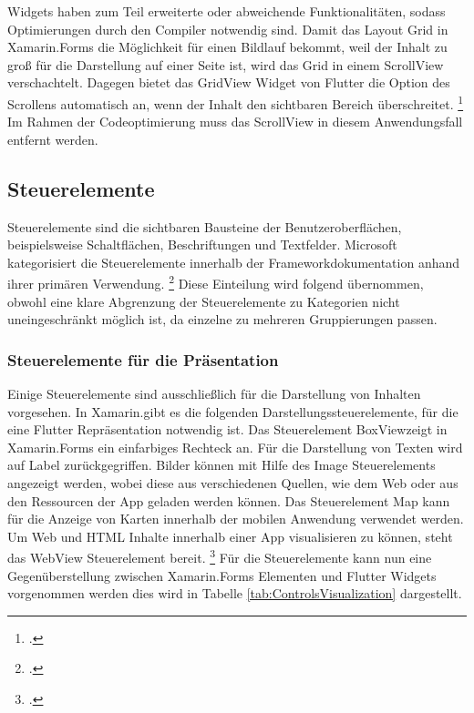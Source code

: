 Widgets haben zum Teil erweiterte oder abweichende Funktionalitäten, sodass Optimierungen durch den Compiler notwendig sind.  Damit das Layout \glq Grid\grq{} in Xamarin.Forms die Möglichkeit für einen Bildlauf bekommt, weil der Inhalt zu groß für die Darstellung auf einer Seite ist, wird das \glq Grid\grq{} in einem \glq ScrollView\grq{} verschachtelt. Dagegen bietet das \glq GridView\grq{} Widget von Flutter die Option des Scrollens automatisch an, wenn der Inhalt den sichtbaren Bereich überschreitet. \footcite[Vgl.][Abgerufen am \today]{GoogleFlutterGridView2020} Im Rahmen der Codeoptimierung muss das \glq ScrollView\grq{} in diesem Anwendungsfall entfernt werden.

\subsection{Steuerelemente}

Steuerelemente sind die sichtbaren Bausteine der Benutzeroberflächen,  beispielsweise Schaltflächen, Beschriftungen und Textfelder.  
Microsoft kategorisiert die Steuerelemente innerhalb der Frameworkdokumentation anhand ihrer primären Verwendung. \footcite[Vgl.][Abgerufen am \today]{MicrosoftXamViews2020} Diese Einteilung wird folgend übernommen,  obwohl eine klare Abgrenzung der  Steuerelemente zu Kategorien nicht uneingeschränkt möglich ist,  da einzelne zu mehreren Gruppierungen passen.


\subsubsection{Steuerelemente für die Präsentation}
Einige Steuerelemente sind ausschließlich für die Darstellung von Inhalten vorgesehen.  In Xamarin.\@Forms gibt es die folgenden  Darstellungssteuerelemente, für die eine Flutter Repräsentation notwendig ist.  Das Steuerelement \glq BoxView\grq{}zeigt in Xamarin.Forms ein einfarbiges Rechteck an.  Für die Darstellung von Texten wird auf \glq Label\grq{} zurückgegriffen.  Bilder können mit Hilfe des \glq Image\grq{}  Steuerelements angezeigt werden,  wobei diese aus verschiedenen Quellen, wie dem Web oder aus den Ressourcen der App geladen werden können.  Das Steuerelement \glq Map\grq{}  kann für die Anzeige von Karten innerhalb der mobilen Anwendung verwendet werden.  Um Web und HTML Inhalte innerhalb einer App visualisieren zu können, steht das \glq WebView\grq{}  Steuerelement bereit.  \footcite[Vgl.][Abgerufen am \today]{MicrosoftXamLayouts2018} Für die Steuerelemente kann nun eine Gegenüberstellung zwischen Xamarin.Forms Elementen und Flutter Widgets vorgenommen werden dies wird in Tabelle \ref{tab:ControlsVisualization} dargestellt.


